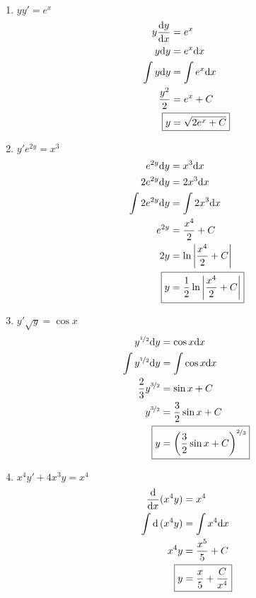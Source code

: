 \documentclass{article}
\begin{document}
\insertTitle

\begin{multicols*}{2}

\begin{enumerate}
\item $y y' = e^x$
\begin{equation*}
\begin{aligned}
y\frac{\dd y}{\dd x} &= e^x \\
y\dd y &= e^x\dd x \\
\int y\dd y &= \int e^x\dd x \\
\frac{y^2}{2} &= e^x + C \\
\Aboxed{y &= \sqrt{2e^x + C}}
\end{aligned}
\end{equation*}

\vfill
\item $y'e^{2y} = x^3$
\begin{equation*}
\begin{aligned}
e^{2y}\dd y &= x^3\dd x \\
2e^{2y}\dd y &= 2x^3\dd x \\
\int 2e^{2y}\dd y &= \int 2x^3\dd x \\
e^{2y} &= \frac{x^4}{2} + C \\
2y &= \ln\left|\frac{x^4}{2}+C\right| \\
\Aboxed{y &= \frac{1}{2}\ln\left|\frac{x^4}{2}+C\right|}
\end{aligned}
\end{equation*}

\vfill
\item $y'\sqrt{y} = \cos x$
\begin{equation*}
\begin{aligned}
y^{\nicefrac{1}{2}}\dd y &= \cos x\dd x \\
\int y^{\nicefrac{1}{2}}\dd y &= \int\cos x\dd x \\
\frac{2}{3}y^{\nicefrac{3}{2}} &= \sin x + C \\
y^{\nicefrac{3}{2}} &= \frac{3}{2}\sin x + C \\
\Aboxed{y &= \left(\frac{3}{2}\sin x + C\right)^{\nicefrac{2}{3}}}
\end{aligned}
\end{equation*}

\vfill
\item $x^4 y' + 4x^3 y = x^4$
\begin{equation*}
\begin{aligned}
\frac{\dd}{\dd x}(x^4y) &= x^4 \\
\int \dd\,(x^4y) &= \int x^4\dd x \\
x^4y &= \frac{x^5}{5} + C \\
\Aboxed{y &= \frac{x}{5} + \frac{C}{x^4}}
\end{aligned}
\end{equation*}


\end{enumerate}
\end{multicols*}
\end{document}
